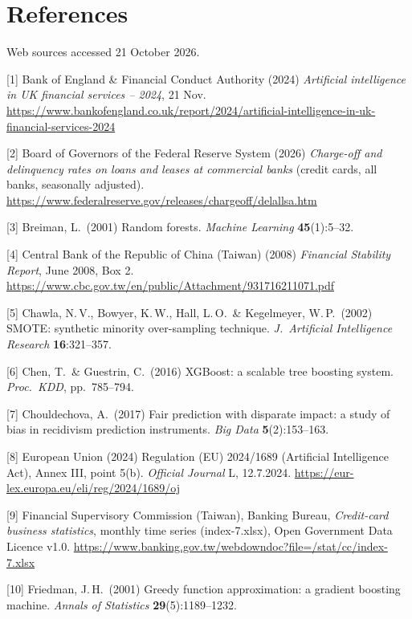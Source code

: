 \section*{References}

{\footnotesize\setlength{\parskip}{1pt}\sloppy
\renewcommand{\UrlFont}{\ttfamily\footnotesize}%
\def\UrlBreaks{\do\/\do-\do.\do=\do_\do?\do&\do+}%
Web sources accessed 21 October 2026.

[1] Bank of England \& Financial Conduct Authority (2024) {\it Artificial intelligence in UK financial services -- 2024}, 21 Nov.
\url{https://www.bankofengland.co.uk/report/2024/artificial-intelligence-in-uk-financial-services-2024}

[2] Board of Governors of the Federal Reserve System (2026) {\it Charge-off and delinquency rates on loans and leases at commercial banks} (credit cards, all banks, seasonally adjusted). \url{https://www.federalreserve.gov/releases/chargeoff/delallsa.htm}

[3] Breiman, L.\ (2001) Random forests. {\it Machine Learning} {\bf 45}(1):5--32.

[4] Central Bank of the Republic of China (Taiwan) (2008) {\it Financial Stability Report}, June 2008, Box 2. \url{https://www.cbc.gov.tw/en/public/Attachment/931716211071.pdf}

[5] Chawla, N.\,V., Bowyer, K.\,W., Hall, L.\,O.\ \& Kegelmeyer, W.\,P.\ (2002) SMOTE: synthetic minority over-sampling technique. {\it J.\ Artificial Intelligence Research} {\bf 16}:321--357.

[6] Chen, T.\ \& Guestrin, C.\ (2016) XGBoost: a scalable tree boosting system. {\it Proc.\ KDD}, pp.\ 785--794.

[7] Chouldechova, A.\ (2017) Fair prediction with disparate impact: a study of bias in recidivism prediction instruments. {\it Big Data} {\bf 5}(2):153--163.

[8] European Union (2024) Regulation (EU) 2024/1689 (Artificial Intelligence Act), Annex III, point 5(b). {\it Official Journal} L, 12.7.2024. \url{https://eur-lex.europa.eu/eli/reg/2024/1689/oj}

[9] Financial Supervisory Commission (Taiwan), Banking Bureau, {\it Credit-card business statistics}, monthly time series (index-7.xlsx), Open Government Data Licence v1.0. \url{https://www.banking.gov.tw/webdowndoc?file=/stat/cc/index-7.xlsx}

[10] Friedman, J.\,H.\ (2001) Greedy function approximation: a gradient boosting machine. {\it Annals of Statistics} {\bf 29}(5):1189--1232.

}
